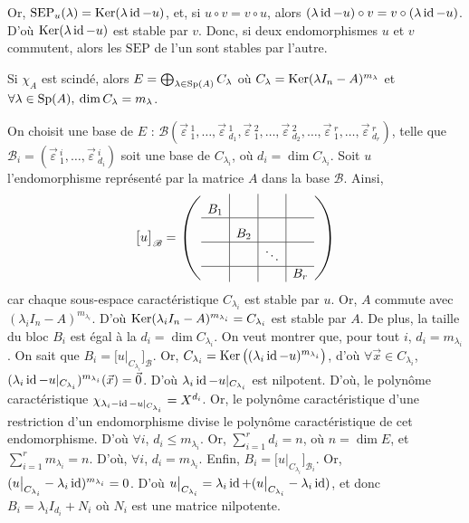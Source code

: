 \begin{prv}
	Or, $\mathrm{SEP}_u(\lambda) = \operatorname{Ker}(\lambda\operatorname{id} - u)$, et, si $u \circ v = v \circ u$, alors $(\lambda\operatorname{id} - u)  \circ v = v  \circ (\lambda \operatorname{id} - u)$. D'où $\operatorname{Ker}(\lambda \operatorname{id} - u)$\/ est stable par $v$.
	Donc, si deux endomorphismes $u$\/ et $v$\/ commutent, alors les $\mathrm{SEP}$\/ de l'un sont stables par l'autre.
\end{prv}

\begin{rap}[proposition 30]
	Si $\chi_A$\/ est scindé, alors $E = \bigoplus_{\lambda \in \operatorname{Sp}(A)} C_\lambda$\/ où $C_\lambda =\operatorname{Ker}(\lambda I_n - A)^{m_\lambda}$\/ et {\color{yellow} $\forall \lambda \in \operatorname{Sp}(A),\:\dim C_\lambda = m_\lambda$}.
\end{rap}

\begin{exo}
	On choisit une base de $E$\/ : $\mathscr{B}(\vec{\varepsilon}\,^1_1, \ldots, \vec{\varepsilon}\,^1_{d_1}, \vec{\varepsilon}\,^2_1, \ldots, \vec{\varepsilon}\,^2_{d_2}, \ldots, \vec{\varepsilon}\,^r_1, \ldots, \vec{\varepsilon}\,^r_{d_r})$, telle que $\mathscr{B}_i = (\vec{\varepsilon}\,^i_1,\ldots,\vec{\varepsilon}\,^i_{d_i})$\/ soit une base de $C_{\lambda_i}$, où $d_i = \dim C_{\lambda_i}$.
	Soit $u$\/ l'endomorphisme représenté par la matrice $A$\/ dans la base $\mathscr{B}$.
	Ainsi, \[
		\big[u\big]_\mathscr{B} = \left(
		\begin{array}{c|c|c|c}
			B_1&\phantom{\ddots}&&\\ \hline
			&B_2&\phantom{\ddots}&\\ \hline
			&&\ddots&\\ \hline
			&&&B_r\\
		\end{array}\right)
	\] car chaque sous-espace caractéristique $C_{\lambda_i}$\/ est stable par $u$. Or, $A$\/ commute avec $(\lambda_i I_n - A)^{m_{\lambda_i}}$. D'où $\operatorname{Ker}(\lambda_i I_n - A)^{m_{\lambda_i}} = C_{\lambda_i}$\/ est stable par $A$.
	De plus, la taille du bloc $B_i$\/ est égal à la $d_i = \dim C_{\lambda_i}$. On veut montrer que, pour tout $i$, $d_i = m_{\lambda_i}$. On sait que $B_i = \big[u|_{C_{\lambda_i}}\!\!\big]_\mathscr{B}$. Or, $C_{\lambda_i} = \operatorname{Ker}\big((\lambda_i \operatorname{id} - u)^{m_{\lambda_i}}\big)$, d'où $\forall \vec{x} \in C_{\lambda_i}$, $(\lambda_i\operatorname{id} - u|_{C_{\lambda_i}})^{m_{\lambda_i}}(\vec{x}) = \vec{0}$.
	D'où $\lambda_i \operatorname{id} - u|_{C_{\lambda_i}}$\/ est nilpotent. D'où, le polynôme caractéristique $\chi_{\lambda_i - \operatorname{id} - u|_{C_{\lambda_i}}} = X^{d_i}$.
	Or, le polynôme caractéristique d'une restriction d'un endomorphisme divise le polynôme caractéristique de cet endomorphisme. D'où $\forall i$, $d_i \le m_{\lambda_i}$. Or, $\sum_{i=1}^r d_i = n$, où $n = \dim E$, et $\sum_{i=1}^r m_{\lambda_i} = n$. D'où, $\forall i$, $d_i = m_{\lambda_i}$.
	Enfin, $B_i = \big[u\big|_{C_{\lambda_i}}\big]_{\mathscr{B}_i}$. Or, $(u\big|_{C_{\lambda_i}} - \lambda_i \operatorname{id})^{m_{\lambda_i}} = 0$. D'où $u\big|_{C_{\lambda_i}} = \lambda_i \operatorname{id} + (u\big|_{C_{\lambda_i}} - \lambda_i\operatorname{id})$, et donc $B_i = \lambda_i I_{d_i} + N_i$\/ où $N_i$\/ est une matrice nilpotente.
\end{exo}


